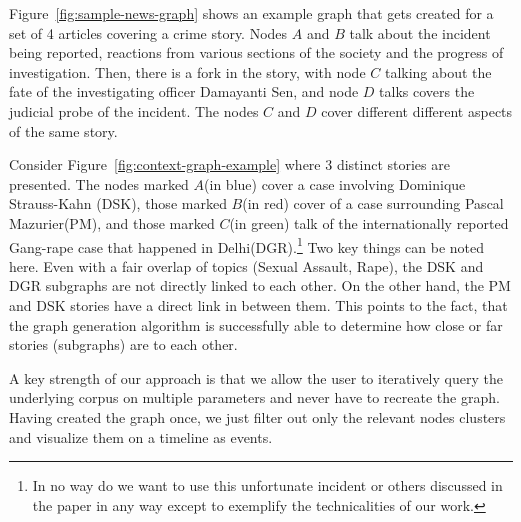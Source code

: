 Figure~\ref{fig:sample-news-graph} shows an example graph that gets created for a set of 4
articles covering a crime story. Nodes $A$ and $B$ talk about the incident being reported, reactions from various sections of the society and
the progress of investigation. Then, there is a fork in the story, with node $C$ talking about the fate of the investigating officer Damayanti Sen, 
and node $D$ talks covers the judicial probe of the incident. The nodes $C$ and $D$ cover different different aspects of the same story. 

Consider Figure~\ref{fig:context-graph-example} where 3 distinct stories are presented. The nodes marked $A$(in blue) cover a case involving Dominique Strauss-Kahn (DSK), 
those marked $B$(in red) cover of a case surrounding Pascal Mazurier(PM), and those marked $C$(in green) talk of the internationally reported Gang-rape case
that happened in Delhi(DGR).\footnote{In no way do we want to use this unfortunate incident or others discussed in the paper in any way except 
to exemplify the technicalities of our work.} Two key things can be noted here. Even with a fair overlap of topics (Sexual Assault, Rape), the DSK and DGR subgraphs are not directly linked to each other.
On the other hand, the PM and DSK stories have a direct link in between them. This points to the fact, that the graph generation algorithm is successfully able
to determine how close or far stories (subgraphs) are to each other.

A key strength of our approach is that we allow the user to iteratively query the underlying corpus on multiple parameters and never have to recreate
the graph. Having created the graph once, we just filter out only the relevant nodes clusters and visualize them on a timeline as events. 
